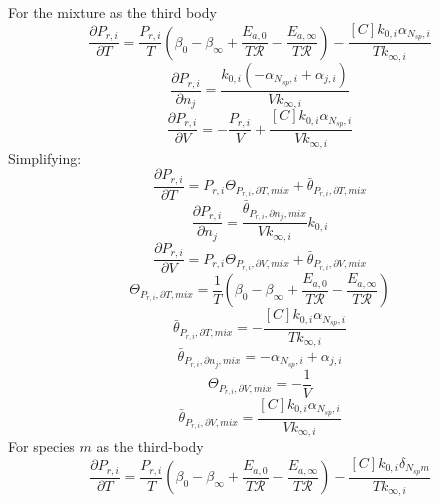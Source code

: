 \documentclass[a4paper,10pt]{article}
\newcommand{\ns}{N_{sp}}
\newcommand{\Ru}{\mathcal{R}}
\begin{document}
For the mixture as the third body
\begin{dmath} \frac{\partial P_{r, i} }{\partial T } = \frac{P_{r, i}}{T} \left(\beta_{0} - \beta_{\infty} + \frac{E_{a, 0}}{T \Ru} - \frac{E_{a, \infty}}{T \Ru}\right) - \frac{[C] k_{0, i} \alpha_{\ns,i}}{T k_{\infty, i}}\end{dmath} 
\begin{dmath} \frac{\partial P_{r, i} }{\partial {n_j} } = \frac{k_{0, i} \left(- \alpha_{\ns,i} + \alpha_{j,i}\right)}{V k_{\infty, i}}\end{dmath} 
\begin{dmath} \frac{\partial P_{r, i} }{\partial V } = - \frac{P_{r, i}}{V} + \frac{[C] k_{0, i} \alpha_{\ns,i}}{V k_{\infty, i}}\end{dmath} 
Simplifying:
\begin{dmath} \frac{\partial P_{r, i} }{\partial T } = P_{r, i} \Theta_{P_{r,i}, \partial T, mix} + \bar{\theta}_{P_{r, i}, \partial T, mix}\end{dmath} 
\begin{dmath} \frac{\partial P_{r, i} }{\partial {n_j} } = \frac{\bar{\theta}_{P_{r, i}, \partial n_j, mix}}{V k_{\infty, i}} k_{0, i}\end{dmath} 
\begin{dmath} \frac{\partial P_{r, i} }{\partial V } = P_{r, i} \Theta_{P_{r,i}, \partial V, mix} + \bar{\theta}_{P_{r, i}, \partial V, mix}\end{dmath} 
\begin{dmath} \Theta_{P_{r,i}, \partial T, mix} = \frac{1}{T} \left(\beta_{0} - \beta_{\infty} + \frac{E_{a, 0}}{T \Ru} - \frac{E_{a, \infty}}{T \Ru}\right)\end{dmath} 
\begin{dmath} \bar{\theta}_{P_{r, i}, \partial T, mix} = - \frac{[C] k_{0, i} \alpha_{\ns,i}}{T k_{\infty, i}}\end{dmath} 
\begin{dmath} \bar{\theta}_{P_{r, i}, \partial n_j, mix} = - \alpha_{\ns,i} + \alpha_{j,i}\end{dmath} 
\begin{dmath} \Theta_{P_{r,i}, \partial V, mix} = - \frac{1}{V}\end{dmath} 
\begin{dmath} \bar{\theta}_{P_{r, i}, \partial V, mix} = \frac{[C] k_{0, i} \alpha_{\ns,i}}{V k_{\infty, i}}\end{dmath} 
For species $m$ as the third-body
\begin{dmath} \frac{\partial P_{r, i} }{\partial T } = \frac{P_{r, i}}{T} \left(\beta_{0} - \beta_{\infty} + \frac{E_{a, 0}}{T \Ru} - \frac{E_{a, \infty}}{T \Ru}\right) - \frac{[C] k_{0, i} \delta_{\ns m}}{T k_{\infty, i}}\end{dmath} 
\end{document}
